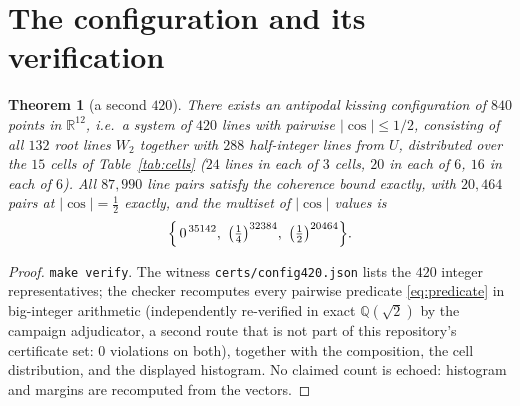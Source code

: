 \documentclass[11pt]{article}
\newtheorem{theorem}{Theorem}
\theoremstyle{remark}
\newcommand{\RR}{\mathbb{R}}
\newcommand{\QQ}{\mathbb{Q}}
\begin{document}
\section{The configuration and its verification}\label{sec:config}

\begin{theorem}[a second $420$]\label{thm:exists}
There exists an antipodal kissing configuration of $840$ points in
$\RR^{12}$, i.e.\ a system of $420$ lines with pairwise $|\cos|\le 1/2$,
consisting of all $132$ root lines $W_2$ together with $288$ half-integer
lines from $U$, distributed over the $15$ cells of
Table~\ref{tab:cells} ($24$ lines in each of $3$ cells, $20$ in each of
$6$, $16$ in each of $6$). All $87{,}990$ line pairs satisfy the coherence
bound exactly, with $20{,}464$ pairs at $|\cos|=\tfrac12$ exactly, and the
multiset of $|\cos|$ values is
\[
\Bigl\{\,0^{\,35142},\ \bigl(\tfrac14\bigr)^{32384},\
\bigl(\tfrac12\bigr)^{20464}\Bigr\}.
\]
\end{theorem}

\begin{proof}
\texttt{make verify}. The witness \texttt{certs/config420.json} lists the
$420$ integer representatives; the checker recomputes every pairwise
predicate \eqref{eq:predicate} in big-integer arithmetic (independently
re-verified in exact $\QQ(\sqrt2)$ by the campaign adjudicator, a second
route that is not part of this repository's certificate set:
$0$ violations on both), together with the composition, the cell
distribution, and the displayed histogram. No claimed count is echoed:
histogram and margins are recomputed from the vectors.
\end{proof}
\end{document}
